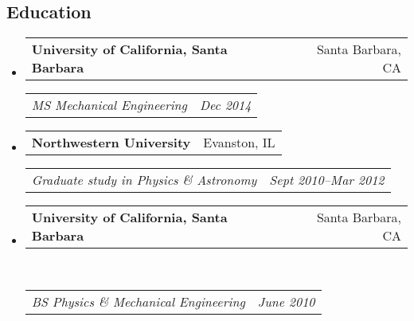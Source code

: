 \documentclass[10pt,letterpaper]{article}
\makeatletter
\newcommand{\headerrow}[2]
{\begin{tabular*}{\linewidth}{l@{\extracolsep{\fill}}r}
	#1 &
	#2 \\
\end{tabular*}}
\makeatother
\begin{document}
\subsection*{Education}
\begin{itemize}
	\parskip=-0.1em
	\item 
	\headerrow
		{\textbf{University of California, Santa Barbara}}
		{Santa Barbara, CA}
	\headerrow
		{\emph{MS  Mechanical Engineering}}
		{\emph{Dec 2014}}
	\item 
	\headerrow
		{\textbf{Northwestern University}}
		{Evanston, IL}
	\headerrow
		{\emph{Graduate study in Physics \& Astronomy}}
		{\emph{Sept 2010--Mar 2012}}
	\item 
	\headerrow
		{\textbf{University of California, Santa Barbara}}
		{Santa Barbara, CA}	\\
	\headerrow
		{\emph{BS Physics \&  Mechanical Engineering}}
		{\emph{June 2010}}
\end{itemize}
\end{document}

